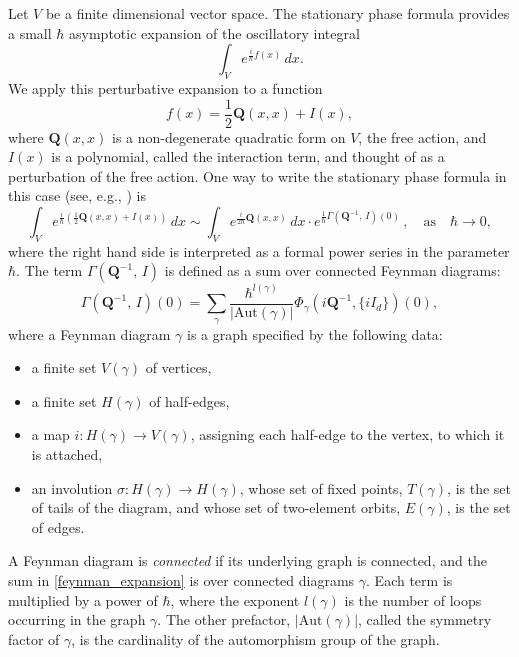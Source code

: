 \documentclass[reqno]{amsart}
\theoremstyle{definition}
\theoremstyle{remark}
\newcommand{\h}{\hbar}
\begin{document}
Let $V$ be a finite dimensional vector space. The stationary phase formula provides a small $\hbar$ asymptotic expansion of the oscillatory integral
$$\int_V e^{\frac{i}{\h}f(x)}\,dx.$$
We apply this perturbative expansion to a function
$$f(x) = \frac{1}{2}\mathbf{Q}(x,x) + I(x),$$
where $\mathbf{Q}(x,x)$ is a non-degenerate quadratic form on $V$, the free action, and $I(x)$ is a polynomial, called the interaction term, and thought of as a perturbation of the free action. One way to write the stationary phase formula in this case (see, e.g., \cite{mnev}) is
\begin{equation}
\label{stationary_phase}
    \int_V e^{\frac{i}{\h}(\frac{1}{2}\mathbf{Q}(x,x)+I(x))}\,dx \sim \int_V e^{\frac{i}{2\hbar}\mathbf{Q}(x,x)}\,dx \cdot e^{\frac{1}{\h}\Gamma(\mathbf{Q}^{-1},\,I)(0)}\,, \quad \mathrm{as}\quad \h \to 0,
\end{equation}
where the right hand side is interpreted as a formal power series in the parameter $\h$. The term $\Gamma(\mathbf{Q}^{-1},\,I)$ is defined as a sum over connected Feynman diagrams:
\begin{equation}
\label{feynman_expansion}
    \Gamma(\mathbf{Q}^{-1},\,I)(0) = \sum_\gamma \frac{\h^{l(\gamma)}}{|\mathrm{Aut}(\gamma)|}\Phi_\gamma(i\mathbf{Q}^{-1},\{iI_d\})(0),
\end{equation}
where a Feynman diagram $\gamma$ is a graph specified by the following data:
\begin{itemize}
    \item a finite set $V(\gamma)$ of vertices,
    \item a finite set $H(\gamma)$ of half-edges,
    \item a map $i: H(\gamma) \to V(\gamma)$, assigning each half-edge to the vertex, to which it is attached,
    \item an involution $\sigma: H(\gamma) \to H(\gamma)$, whose set of fixed points, $T(\gamma)$, is the set of tails of the diagram, and whose set of two-element orbits, $E(\gamma)$, is the set of edges.
\end{itemize}

A Feynman diagram is \emph{connected} if its underlying graph is connected, and the sum in \eqref{feynman_expansion} is over connected diagrams $\gamma$. Each term is multiplied by a power of $\h$, where the exponent $l(\gamma)$ is the number of loops occurring in the graph $\gamma$. The other prefactor, $|\mathrm{Aut}(\gamma)|$, called the symmetry factor of $\gamma$, is the cardinality of the automorphism group of the graph.
\end{document}
